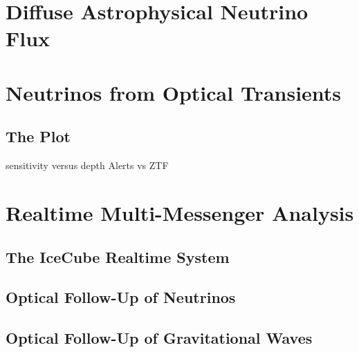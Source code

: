 \section{Diffuse Astrophysical Neutrino Flux}

\section{Neutrinos from Optical Transients}
\subsection{The Plot}
sensitivity versus depth
Alerts vs ZTF

\section{Realtime Multi-Messenger Analysis}
\subsection{The IceCube Realtime System}
\subsection{Optical Follow-Up of Neutrinos}

\subsection{Optical Follow-Up of Gravitational Waves}

